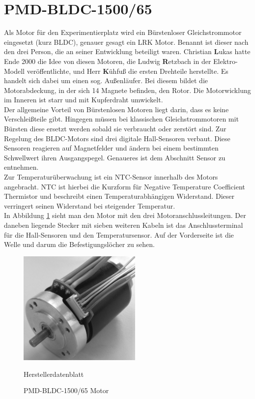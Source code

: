 \newpage
\section{PMD-BLDC-1500/65}
Als Motor für den Experimentierplatz wird ein Bürstenloser Gleichstrommotor eingesetzt (kurz BLDC), genauer gesagt ein LRK Motor. 
Benannt ist dieser nach den drei Person, die an seiner Entwicklung beteiligt waren.
Christian \textbf{L}ukas hatte Ende 2000 die Idee von diesen Motoren, die Ludwig \textbf{R}etzbach in der Elektro-Modell veröffentlichte, und Herr \textbf{K}ühfuß die ersten Drehteile herstellte.
Es handelt sich dabei um einen sog. Außenläufer.
Bei diesem bildet die Motorabdeckung, in der sich 14 Magnete befinden, den Rotor.
Die Motorwicklung im Inneren ist starr und mit Kupferdraht umwickelt.\\


Der allgemeine Vorteil von Bürstenlosen Motoren liegt darin, dass es keine Verschleißteile gibt.
Hingegen müssen bei klassischen Gleichstrommotoren mit Bürsten diese ersetzt werden sobald sie verbraucht oder zerstört sind.
Zur Regelung des BLDC-Motors sind drei digitale Hall-Sensoren verbaut.
Diese Sensoren reagieren auf Magnetfelder und ändern bei einem bestimmten Schwellwert ihren Ausgangspegel.
Genaueres ist dem Abschnitt Sensor zu entnehmen.\\


Zur Temperaturüberwachung ist ein NTC-Sensor innerhalb des Motors angebracht. 
NTC ist hierbei die Kurzform für Negative Temperature Coefficient Thermistor und beschreibt einen Temperaturabhängigen Widerstand.
Dieser verringert seinen Widerstand bei steigender Temperatur.\\

In Abbildung \ref{fig:BLDC} sieht man den Motor mit den drei Motoranschlussleitungen.
Der daneben liegende Stecker mit sieben weiteren Kabeln ist das Anschlussterminal für die Hall-Sensoren und den Temperatursensor.
Auf der Vorderseite ist die Welle und darum die Befestigungslöcher zu sehen.

\begin{figure}[htbp]
	\centering
	\includegraphics[width=6cm]{hardware/graphics/BLDC_Motor}
	\caption{PMD-BLDC-1500/65 Motor}
	\quelle Herstellerdatenblatt
	\label{fig:BLDC}
\end{figure}

